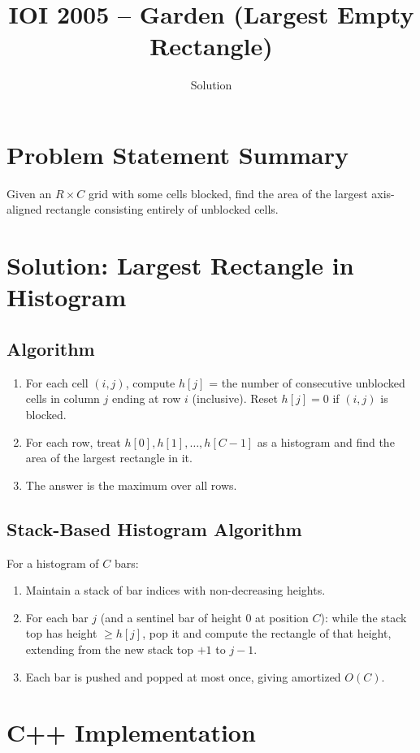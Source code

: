 \documentclass[11pt,a4paper]{article}
\title{IOI 2005 -- Garden (Largest Empty Rectangle)}
\author{Solution}
\date{}
\begin{document}
\maketitle

\section{Problem Statement Summary}
Given an $R \times C$ grid with some cells blocked, find the area of the
largest axis-aligned rectangle consisting entirely of unblocked cells.

\section{Solution: Largest Rectangle in Histogram}

\subsection{Algorithm}
\begin{enumerate}
  \item For each cell $(i, j)$, compute $h[j]$ = the number of
        consecutive unblocked cells in column $j$ ending at row $i$
        (inclusive). Reset $h[j] = 0$ if $(i, j)$ is blocked.
  \item For each row, treat $h[0], h[1], \ldots, h[C{-}1]$ as a
        histogram and find the area of the largest rectangle in it.
  \item The answer is the maximum over all rows.
\end{enumerate}

\subsection{Stack-Based Histogram Algorithm}
For a histogram of $C$ bars:
\begin{enumerate}
  \item Maintain a stack of bar indices with non-decreasing heights.
  \item For each bar $j$ (and a sentinel bar of height 0 at position
        $C$): while the stack top has height $\ge h[j]$, pop it and
        compute the rectangle of that height, extending from the new
        stack top $+ 1$ to $j - 1$.
  \item Each bar is pushed and popped at most once, giving amortized
        $O(C)$.
\end{enumerate}

\section{C++ Implementation}
\end{document}
